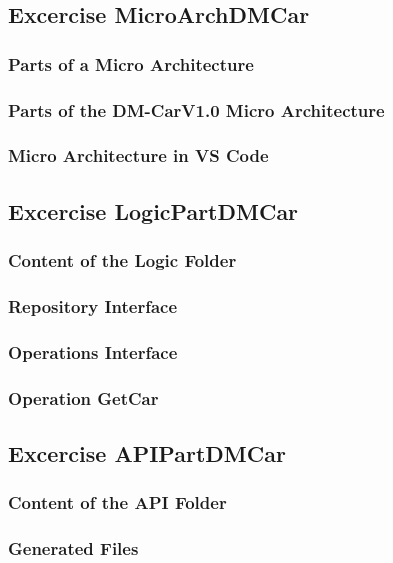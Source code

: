 \subsection{Excercise MicroArchDMCar}
\subsubsection*{Parts of a Micro Architecture}


\subsubsection*{Parts of the DM-CarV1.0 Micro Architecture}

\subsubsection*{Micro Architecture in VS Code}

\subsection{Excercise LogicPartDMCar}
\subsubsection*{Content of the Logic Folder}
\subsubsection*{Repository Interface}
\subsubsection*{Operations Interface}
\subsubsection*{Operation GetCar}


\subsection{Excercise APIPartDMCar}
\subsubsection*{Content of the API Folder}
\subsubsection*{Generated Files}
